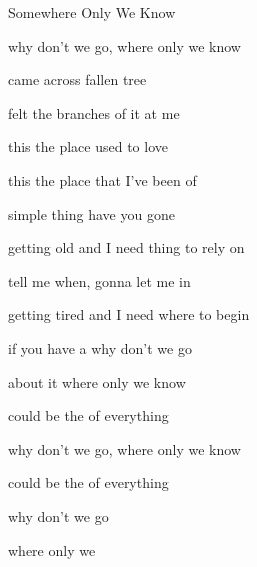\begin{SBSong}{Somewhere Only We Know}
\begin{SBVerse}
     why don't we go, where only we know
  \end{SBVerse}
  \begin{SBVerse}
     came across  fallen tree
    
     felt the branches of it  at me
    
     this the place  used to love
    
     this the place that I've been  of
  \end{SBVerse}
  
  \begin{SBVerse}
     simple thing  have you gone
    
     getting old and I need thing to rely on
    
     tell me when,  gonna let me in
    
     getting tired and I need where to begin
  \end{SBVerse}
  \begin{SBVerse}
     if you have a  why don't we go
    
     about it where only we know
    
     could be the  of everything
    
     why don't we go, where only we know
  \end{SBVerse} 
  \begin{SBVerse}
      could be the  of everything
     
      why don't we go
     
     where only we  
  \end{SBVerse}
\end{SBSong}

